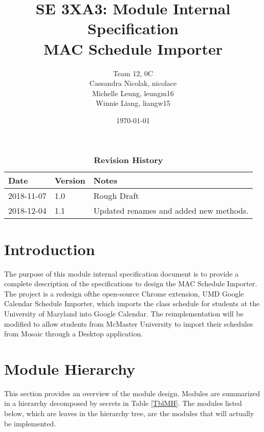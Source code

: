 \documentclass[12pt, titlepage]{article}
\title{SE 3XA3: Module Internal Specification\\MAC Schedule Importer}
\author{Team 12, 0C
		\\ Cassandra Nicolak, nicolace
		\\ Michelle Leung, leungm16
		\\ Winnie Liang, liangw15
}
\date{\today}
\newcounter{mnum}
\newcommand{\mthemnum}{M\themnum}
\begin{document}
\maketitle

\tableofcontents
\listoftables
\listoffigures

\begin{table}[bp]
\caption{\bf Revision History}
\begin{tabularx}{\textwidth}{p{3cm}p{2cm}X}
\toprule {\bf Date} & {\bf Version} & {\bf Notes}\\
\midrule
2018-11-07 & 1.0 & Rough Draft\\
2018-12-04 & 1.1 & Updated renames and added new methods.\\
\bottomrule
\end{tabularx}
\end{table}

\newpage


\section{Introduction}
\hspace{5mm} The purpose of this module internal specification document is to provide a complete description of the specifications to design the MAC Schedule Importer. The project is a  redesign ofthe open-source Chrome extension, UMD Google Calendar Schedule Importer, which imports the class schedule for students at the University of Maryland into Google Calendar. The reimplementation will be modified to allow students from McMaster University to import their schedules from Mosaic through a Desktop application.

\section{Module Hierarchy} \label{SecMH}

This section provides an overview of the module design. Modules are summarized
in a hierarchy decomposed by secrets in Table \ref{TblMH}. The modules listed
below, which are leaves in the hierarchy tree, are the modules that will
actually be implemented.

\end{document}
